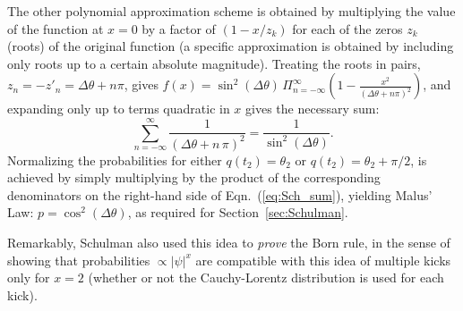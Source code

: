 \documentclass[rmp, aps, preprint, longbibliography]{revtex4-1}
\newcommand{\eq}[1]{{Eqn.~(\ref{#1})}}
\begin{document}
The other polynomial approximation scheme is obtained by multiplying the value of the function at $x=0$ by a factor of $(1-x/z_k)$ for each of the zeros $z_k$ (roots) of the original function (a specific approximation is obtained by including only roots up to a certain absolute magnitude).  Treating the roots in pairs, $z_n=-z'_n=\Delta\theta+n\pi$, gives 
$f(x) = \sin^2(\Delta\theta) \, 
\Pi_{n=-\infty}^\infty \left( 1 - \frac{x^2}{(\Delta\theta+ n\pi)^2} \right)$, 
and expanding only up to terms quadratic in $x$ gives the necessary sum:
\begin{equation}
\label{eq:Sch_sum}
\sum _{n=-\infty }^{\infty } \frac{1}{( \Delta\theta + n\,\pi )^{2}} = 
\frac{1}{ \sin^{2} \left( \Delta\theta \right) } .
\end{equation}
Normalizing the probabilities for either $q(t_2)=\theta_2$ or $q(t_2)=\theta_2+\pi/2$, is achieved by simply multiplying by the product of the corresponding denominators on the right-hand side of \eq{eq:Sch_sum}, yielding Malus' Law: $p=\cos^2(\Delta\theta)$, as required for Section~\ref{sec:Schulman}.

Remarkably, Schulman also used this idea to \emph{prove} the Born rule, in the sense of showing that probabilities $\propto |\psi|^x$ are compatible with this idea of multiple kicks only for $x=2$ (whether or not the Cauchy-Lorentz distribution is used for each kick).

%

\end{document}
